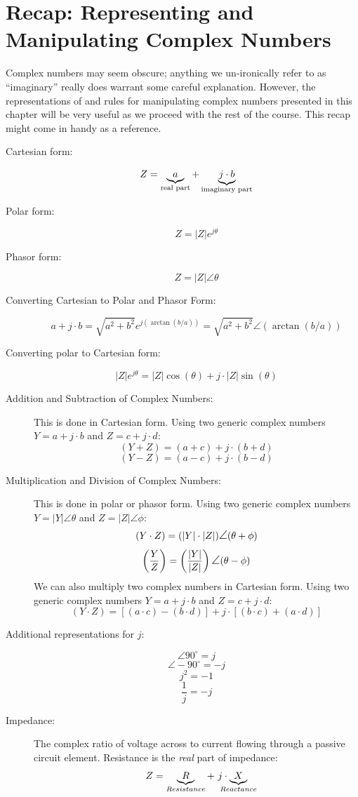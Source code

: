 \section{Recap: Representing and Manipulating Complex Numbers}
Complex numbers may seem obscure; anything we un-ironically refer to as ``imaginary'' really does warrant some careful explanation. However, the representations of and rules for manipulating complex numbers presented in this chapter will be very useful as we proceed with the rest of the course. This recap might come in handy as a reference.
\begin{description}
\item[Cartesian form:]
$$
Z=\underbrace{a}_{\textnormal{real part}} + \underbrace{j\cdot b}_{\textnormal{imaginary part}}
$$
\item[Polar form:]
$$
Z = |Z|e^{j\theta}
$$
\item[Phasor form:]
$$
Z = |Z|\angle\theta
$$
\item[Converting Cartesian to Polar and Phasor Form:]
$$
a + j\cdot b = \sqrt{a^2 + b^2}e^{j(\arctan(b/a))} = \sqrt{a^2 + b^2}\angle(\arctan(b/a))
$$
\item[Converting polar to Cartesian form:]
$$
|Z|e^{j\theta} = |Z|\cos(\theta) + j\cdot |Z|\sin(\theta)
$$
\item[Addition and Subtraction of Complex Numbers:] This is done in Cartesian form. Using two generic complex numbers $Y=a+j\cdot b$ and $Z=c+j\cdot d$:
$$
(Y+Z) = (a+c) + j\cdot(b+d)
$$
$$
(Y-Z) = (a-c) + j\cdot(b-d)
$$
\item[Multiplication and Division of Complex Numbers:] This is done in polar or phasor form. Using two generic complex numbers $Y = |Y|\angle\theta$ and $Z = |Z|\angle\phi$:
$$
(Y\cdot Z) = (|Y|\cdot|Z|)\mathlarger{\angle}(\theta+\phi)
$$
$$
\left(\frac{Y}{Z}\right) = \left(\frac{|Y|}{|Z|}\right)\mathlarger{\angle}(\theta-\phi)
$$
We can also multiply two complex numbers in Cartesian form. Using two generic complex numbers $Y=a+j\cdot b$ and $Z=c+j\cdot d$:
$$
(Y\cdot Z) = [(a\cdot c) - (b\cdot d)] + j\cdot[(b\cdot c) + (a\cdot d)]
$$
\item[Additional representations for $j$:] 
$$
\angle90^{\circ} = j
$$
$$
\angle-90^{\circ} = -j
$$
$$
j^2 = -1
$$
$$
\frac{1}{j} = -j
$$
\item[Impedance:] The complex ratio of voltage across to current flowing through a passive circuit element. Resistance is the \textit{real} part of impedance:
$$
Z = \underbrace{R}_{Resistance} + \textrm{  } j \cdot \underbrace{X}_{\mathclap{Reactance}}
$$



\end{description}